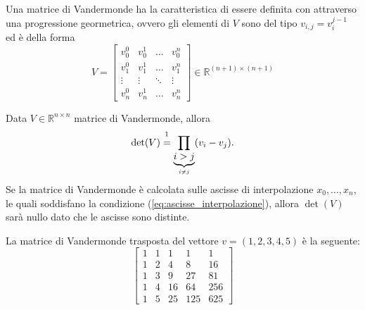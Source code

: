  \begin{definition}
	Una matrice di Vandermonde ha la caratteristica di essere definita con attraverso una progressione geormetrica, ovvero gli elementi di $V$ sono del tipo $v_{i,j}=v_i^{j-1}$ ed è della forma
	 \begin{equation*}
	 	V=\begin{bmatrix}
	 		v_0^0 & v_0^1 & \hdots & v_0^n\\
	 		v_1^0 & v_1^1 & \hdots & v_1^n\\
	 		\vdots & \vdots &\ddots & \vdots\\
	 		v_n^0 & v_n^1 & \hdots & v_n^n
	 	\end{bmatrix}\in\mathbb R^{(n+1)\times (n+1)}
	 \end{equation*}
\end{definition}

\begin{property}\label{prop:determinante_matrice_vandermonde}
	Data $V\in\mathbb{R}^{n\times n}$ matrice di Vandermonde, allora
	\begin{equation}\label{eq:determinante_matrice_vandermonde}
		\det(V)\overset{\footnotemark}{=}\prod_{\underbrace{i>j}_{i\neq j}}(v_i-v_j).
	\end{equation}
	Se la matrice di Vandermonde è calcolata sulle ascisse di interpolazione $x_0, \hdots, x_n$, le quali soddisfano la condizione (\ref{eq:ascisse_interpolazione}), allora $\det(V)$ sarà nullo dato che le ascisse sono distinte.
\end{property}

\begin{example}
	La matrice di Vandermonde trasposta del vettore $v=(1, 2, 3, 4, 5)$ è la seguente:
	\begin{equation*}
		\begin{bmatrix}
			1    &  1 & 1  &   1  &   1 \\
			1    & 2   &  4  &   8   & 16 \\
			1     & 3   &  9 &   27 &   81\\
			1    & 4   & 16  &  64  &  256 \\
			1     & 5 &   25 &  125 &  625
		\end{bmatrix}
	\end{equation*}
\end{example}

